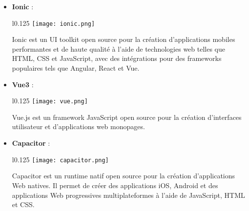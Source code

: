   \begin{itemize}
    \item \textbf{Ionic} :\\
    \begin{minipage}{\linewidth}
      \begin{wrapfigure}{l}{0.125\textwidth}
        \vspace{-0.5cm}
        \texttt{[image: ionic.png]} 
      \end{wrapfigure}
      Ionic est un UI toolkit open source pour la création d'applications mobiles performantes et de haute qualité à l'aide de technologies web telles que HTML, CSS et JavaScript, avec des intégrations pour des frameworks populaires tels que Angular, React et Vue.
    \end{minipage}
  
    \vspace{0.5cm}
  
    \item \textbf{Vue3} :\\
    \begin{minipage}{\linewidth}
      \begin{wrapfigure}{l}{0.125\textwidth}
        \vspace{-0.5cm}
        \texttt{[image: vue.png]} 
      \end{wrapfigure}
      Vue.js est un framework JavaScript open source pour la création d'interfaces utilisateur et d'applications web monopages.
    \end{minipage}
  
    \vspace{0.5cm}
  
    \item \textbf{Capacitor} :\\
    \begin{minipage}{\linewidth}
      \begin{wrapfigure}{l}{0.125\textwidth}
        \vspace{-0.5cm}
        \texttt{[image: capacitor.png]} 
      \end{wrapfigure}
      Capacitor est un runtime natif open source pour la création d'applications Web natives. Il permet de créer des applications iOS, Android et des applications Web progressives multiplateformes à l'aide de JavaScript, HTML et CSS.
    \end{minipage}
  
    \vspace{0.5cm}
  

\end{itemize}
